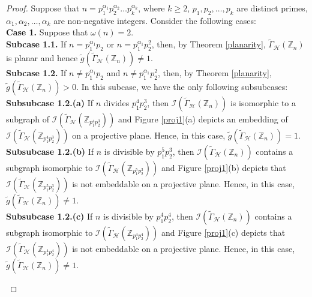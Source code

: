 \documentclass[11pt,a4paper]{article}
\theoremstyle{definition}
\theoremstyle{remark}
\begin{document}
		\begin{proof}
				Suppose that  $n=p_1^{\alpha_1}p_2^{\alpha_2}\ldots p_k^{\alpha_k}$, where  $k \geq 2$, $p_1,p_2, \ldots, p_k$ are distinct primes,  $\alpha_1, \alpha_2, \ldots, \alpha_k$ are non-negative integers. 
		Consider the following cases:\\
			\textbf{Case 1.} Suppose that $\omega(n) =2$.\\
			\textbf{Subcase 1.1.} If $n=p_1^{\alpha_1}p_2$ or $n=p_1^{\alpha_1}p_2^2$, then, by Theorem \ref{planarity}, $\tilde{\Gamma}_\mathcal{H}(\mathbb{Z}_n)$ is planar and hence $\tilde{g}(\tilde{\Gamma}_\mathcal{H}(\mathbb{Z}_n)) \neq 1$. \\
			\textbf{Subcase 1.2.} If $n \neq p_1^{\alpha_1}p_2$ and  $n \neq p_1^{\alpha_1}p_2^2$,  then, by Theorem \ref{planarity}, $\tilde{g}(\tilde{\Gamma}_\mathcal{H}(\mathbb{Z}_n))> 0$. In this subcase, we have the only following subsubcases:\\
			\textbf{Subsubcase 1.2.(a)} If $n$ divides $p_1^4p_2^3$, then $\mathcal{I}(\tilde{\Gamma}_\mathcal{H}(\mathbb{Z}_n))$ is isomorphic to a subgraph of $\mathcal{I}(\tilde{\Gamma}_\mathcal{H}(\mathbb{Z}_{p_1^4p_2^3}))$ and Figure \ref{proj1}(a) depicts an embedding of $\mathcal{I}(\tilde{\Gamma}_\mathcal{H}(\mathbb{Z}_{p_1^4p_2^3}))$ on a projective plane. Hence, in this case,  $\tilde{g}(\tilde{\Gamma}_\mathcal{H}(\mathbb{Z}_n)) = 1$.\\
			\textbf{Subsubcase 1.2.(b)} If $n$ is divisible by $p_1^5p_2^3$, then $\mathcal{I}(\tilde{\Gamma}_\mathcal{H}(\mathbb{Z}_n))$ contains a subgraph isomorphic to $\mathcal{I}(\tilde{\Gamma}_\mathcal{H}(\mathbb{Z}_{p_1^5p_2^3}))$ and  Figure \ref{proj1}(b) depicts that  $\mathcal{I}(\tilde{\Gamma}_\mathcal{H}(\mathbb{Z}_{p_1^5p_2^3}))$ is not embeddable on a projective plane. Hence, in this case, $\tilde{g}(\tilde{\Gamma}_\mathcal{H}(\mathbb{Z}_n)) \neq  1$.\\
			\textbf{Subsubcase 1.2.(c)} If $n$ is divisible by  $p_1^4p_2^4$, then $\mathcal{I}(\tilde{\Gamma}_\mathcal{H}(\mathbb{Z}_n))$ contains a subgraph isomorphic to $\mathcal{I}(\tilde{\Gamma}_\mathcal{H}(\mathbb{Z}_{p_1^4p_2^4}))$ and Figure \ref{proj1}(c) depicts that  $\mathcal{I}(\tilde{\Gamma}_\mathcal{H}(\mathbb{Z}_{p_1^4p_2^4}))$ is not embeddable on a projective plane. Hence, in this case,  $\tilde{g}(\tilde{\Gamma}_\mathcal{H}(\mathbb{Z}_n)) \neq  1$. 
			
			 \begin{figure}[htbp!]
			 	\centering
\end{figure}
\end{proof}
\end{document}
